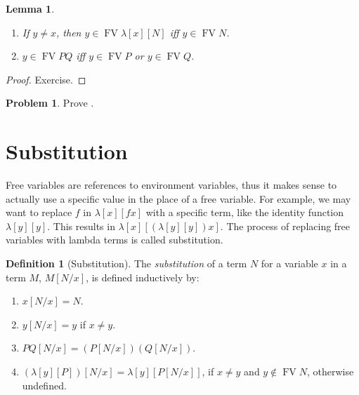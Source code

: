 \documentclass[10pt,a4paper]{article}
\makeatletter
\theoremstyle{plain}
\newtheorem{lem}[thm]{Lemma}
\theoremstyle{definition}
\newtheorem{defn}[thm]{Definition}
\newtheorem{prob}{Problem}[section]
\theoremstyle{remark}
\newenvironment{explain}{}{}
\newcommand*{\olfileid}[3]{}
\newcommand*{\olsection}[1]{\section*{#1}}
\newcommand*{\ollabel}[1]{\label{#1}}
\newcommand{\olref}{\@ifnextchar[{\olref@i}{\olref@final}}
\def\olref@i[#1]{\@ifnextchar[{\olref@ii}{\olref@final}}
\def\olref@ii[#1]{\@ifnextchar[{\olref@iii}{\olref@final}}
\def\olref@iii[#1]{\olref@final}
\def\olref@final#1{\ref{#1}}
\providecommand{\Subst}[3]{#1[#2/#3]}
\providecommand{\lambd}{\ensuremath{\lambda}}
\providecommand{\FV}{\operatorname{FV}}
\providecommand{\FV}{\operatorname{FV}}
\makeatother
\begin{document}
\begin{lem}\ollabel{lem:fv}
  \begin{enumerate}
    \item \ollabel{lem:fv-abs} If $y \neq x$, then $y \in
      \FV{\lambd[x][N]}$ iff $y \in \FV{N}$.
    \item \ollabel{lem:fv-app} $y \in \FV{PQ}$ iff $y \in \FV{P}$ or $y
      \in \FV{Q}$.
    \end{enumerate}
\end{lem}

\begin{proof}
  Exercise.
\end{proof}

\begin{prob}
  Prove \olref[lam][syn][fv]{lem:fv}.
\end{prob}





\olfileid{lam}{syn}{sub}
\olsection{Substitution}

\begin{explain}
Free variables are references to environment variables, thus it makes
sense to actually use a specific value in the place of a free
variable. For example, we may want to replace $f$ in $\lambd[x][f x]$
with a specific term, like the identity function $\lambd[y][y]$. This
results in $\lambd[x][(\lambd[y][y]) x]$. The process of replacing
free variables with lambda terms is called substitution.
\end{explain}

\begin{defn}[Substitution] \ollabel{defn:substitution}
  The \emph{substitution} of a term $N$ for a variable $x$ in a term
  $M$, $\Subst{M}{N}{x}$, is defined inductively by:
  \begin{enumerate}
    \item $\Subst{x}{N}{x} = N$. \ollabel{defn:substitution-1} 
    \item $\Subst{y}{N}{x}  = y$ if $x \neq y$. \ollabel{defn:substitution-2} 
    \item $\Subst{PQ}{N}{x}  = (\Subst{P}{N}{x}) (\Subst{Q}{N}{x})$.
      \ollabel{def:substitution-3}
    \item $\Subst{(\lambd[y][P])}{N}{x} = \lambd[y][\Subst{P}{N}{x}]$,
      if $x \neq y$ and $y \notin \FV{N}$, otherwise undefined.
      \ollabel{defn:substitution-4}
  \end{enumerate}
\end{defn}
\end{document}
